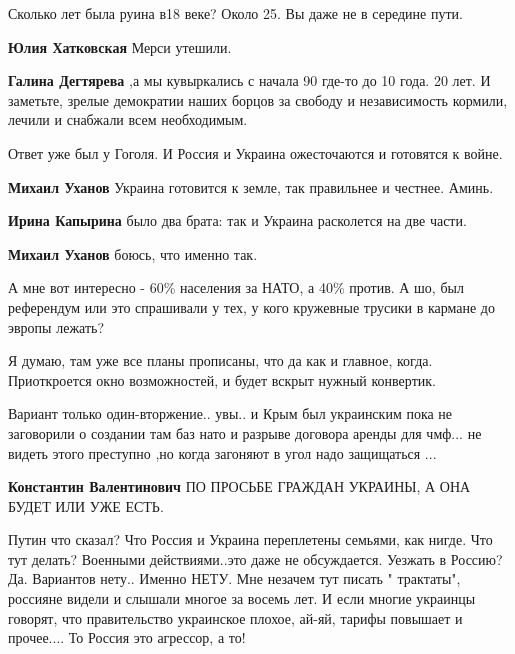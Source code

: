 \begin{itemize}
Сколько лет была руина в18 веке? Около 25. Вы даже не в середине пути.

\begin{itemize} %
\textbf{Юлия Хатковская} Мерси утешили.

\textbf{Галина Дегтярева} ,а мы кувыркались с начала 90 где-то до 10 года. 20 лет. И заметьте, зрелые демократии наших борцов за свободу и независимость кормили, лечили и снабжали всем необходимым.
\end{itemize} %


Ответ уже был у Гоголя. И Россия и Украина ожесточаются и готовятся к войне.

\begin{itemize} %
\textbf{Михаил Уханов} Украина готовится к земле, так правильнее и честнее. Аминь.

\textbf{Ирина Капырина} было два брата: так и Украина расколется на две части.

\textbf{Михаил Уханов} боюсь, что именно так.
\end{itemize} %


А мне вот интересно - 60\% населения за НАТО, а 40\% против. А шо, был референдум
или это спрашивали у тех, у кого кружевные трусики в кармане до эвропы лежать?


Я думаю, там уже все планы прописаны, что да как и главное, когда. Приоткроется окно возможностей, и будет вскрыт нужный конвертик.


Вариант только один-вторжение.. увы.. и Крым был украинским пока не заговорили о
создании там баз нато и разрыве договора аренды для чмф... не видеть этого
преступно ,но когда загоняют в угол надо защищаться ...

\begin{itemize} %
\textbf{Константин Валентинович} ПО ПРОСЬБЕ ГРАЖДАН УКРАИНЫ, А ОНА БУДЕТ ИЛИ УЖЕ ЕСТЬ.
\end{itemize} %


Путин что сказал? Что Россия и Украина переплетены семьями, как нигде. Что тут
делать? Военными действиями..это даже не обсуждается. Уезжать в Россию? Да.
Вариантов нету.. Именно НЕТУ. Мне незачем тут писать " трактаты", россияне
видели и слышали многое за восемь лет. И если многие украинцы говорят, что
правительство украинское плохое, ай-яй, тарифы повышает и прочее.... То Россия
это агрессор, а то!


\end{itemize}
